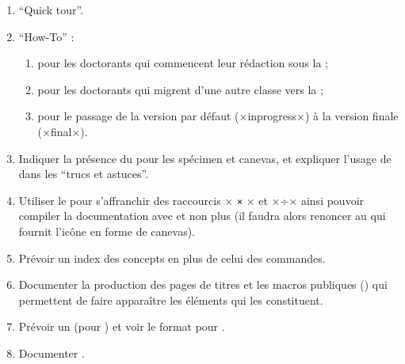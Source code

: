 \begin{enumerate}
\item \foreignquote{english}{Quick tour}.
\item \foreignquote{english}{How-To} :
  \begin{enumerate}
  \item pour les doctorants qui commencent leur rédaction sous la \yatcl{} ;
  \item pour les doctorants qui migrent d'une autre classe vers la \yatcl{} ;
  \item pour le passage de la version par défaut (×inprogress×)
    à la version finale (×final×).
  \end{enumerate}
\item Indiquer la présence du  pour les spécimen et canevas,
  et expliquer l'usage de  dans les \enquote{trucs et astuces}.
\item Utiliser le  pour s'affranchir des raccourcis
  \lstDeleteShortInline×%
  \lstinline|×|
  \lstMakeShortInline[style=dbtex]×%
  et ×÷× ainsi pouvoir compiler la documentation avec  et non
  plus  (il faudra alors renoncer au 
  qui fournit l'icône en forme de canevas).
\item Prévoir un index des concepts en plus de celui des commandes.
\item Documenter la production des pages de titres et les macros publiques
  () qui permettent de faire apparaître les éléments qui
  les constituent.
\item Prévoir un  (pour ) et voir le format
  pour .
\item Documenter .
\end{enumerate}

%
\iffalse
\fi
